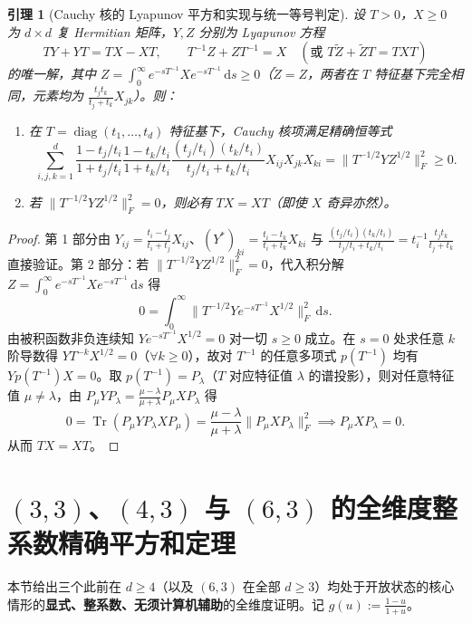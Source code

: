 \documentclass[11pt,a4paper]{article}
\newtheorem{lemma}[theorem]{引理}
\theoremstyle{remark}
\newcommand{\Tr}{\operatorname{Tr}}
\begin{document}
\begin{lemma}[Cauchy 核的 Lyapunov 平方和实现与统一等号判定]\label{lem:eq_unified}
设 $T > 0$，$X \ge 0$ 为 $d\times d$ 复 Hermitian 矩阵，$Y, Z$ 分别为 Lyapunov 方程
\[
T Y + Y T = T X - X T, \qquad T^{-1} Z + Z T^{-1} = X \quad (\text{或 } T \tilde{Z} + \tilde{Z} T = T X T)
\]
的唯一解，其中 $Z = \int_0^\infty e^{-s T^{-1}} X e^{-s T^{-1}}\,\mathrm{d}s \ge 0$（$\tilde{Z} = Z$，两者在 $T$ 特征基下完全相同，元素均为 $\frac{t_j t_k}{t_j+t_k} X_{jk}$）。则：
\begin{enumerate}
  \item 在 $T = \operatorname{diag}(t_1,\dots,t_d)$ 特征基下，Cauchy 核项满足精确恒等式
  \[
  \sum_{i,j,k=1}^d \frac{1-t_j/t_i}{1+t_j/t_i}\frac{1-t_k/t_i}{1+t_k/t_i}\frac{(t_j/t_i)(t_k/t_i)}{t_j/t_i + t_k/t_i} X_{ij} X_{jk} X_{ki}
  = \big\|T^{-1/2} Y Z^{1/2}\big\|_F^2 \ge 0.
  \]
  \item 若 $\|T^{-1/2} Y Z^{1/2}\|_F^2 = 0$，则必有 $T X = X T$（即使 $X$ 奇异亦然）。
\end{enumerate}
\end{lemma}

\begin{proof}
第 1 部分由 $Y_{ij} = \frac{t_i-t_j}{t_i+t_j} X_{ij}$、$(Y^*)_{ki} = \frac{t_i-t_k}{t_i+t_k} X_{ki}$ 与 $\frac{(t_j/t_i)(t_k/t_i)}{t_j/t_i+t_k/t_i} = t_i^{-1}\frac{t_j t_k}{t_j+t_k}$ 直接验证。第 2 部分：若 $\|T^{-1/2} Y Z^{1/2}\|_F^2 = 0$，代入积分解 $Z = \int_0^\infty e^{-s T^{-1}} X e^{-s T^{-1}}\,\mathrm{d}s$ 得
\[
0 = \int_0^\infty \big\|T^{-1/2} Y e^{-s T^{-1}} X^{1/2}\big\|_F^2\,\mathrm{d}s.
\]
由被积函数非负连续知 $Y e^{-s T^{-1}} X^{1/2} = 0$ 对一切 $s \ge 0$ 成立。在 $s=0$ 处求任意 $k$ 阶导数得 $Y T^{-k} X^{1/2} = 0$（$\forall k\ge 0$），故对 $T^{-1}$ 的任意多项式 $p(T^{-1})$ 均有 $Y p(T^{-1}) X = 0$。取 $p(T^{-1}) = P_\lambda$（$T$ 对应特征值 $\lambda$ 的谱投影），则对任意特征值 $\mu \neq \lambda$，由 $P_\mu Y P_\lambda = \frac{\mu-\lambda}{\mu+\lambda} P_\mu X P_\lambda$ 得
\[
0 = \Tr(P_\mu Y P_\lambda X P_\mu) = \frac{\mu-\lambda}{\mu+\lambda}\big\|P_\mu X P_\lambda\big\|_F^2 \implies P_\mu X P_\lambda = 0.
\]
从而 $T X = X T$。
\end{proof}

\section{$(3,3)$、$(4,3)$ 与 $(6,3)$ 的全维度整系数精确平方和定理}

本节给出三个此前在 $d\ge 4$（以及 $(6,3)$ 在全部 $d\ge 3$）均处于开放状态的核心情形的\textbf{显式、整系数、无须计算机辅助}的全维度证明。记 $g(u) := \frac{1-u}{1+u}$。
\end{document}

